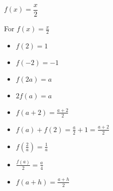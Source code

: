 {$f(x) = \dfrac{x}{2}$}
{For $f(x) = \frac{x}{2}$

\begin{itemize}
\item  $f(2) = 1$
\item  $f(-2) = -1$
\item  $f(2a) = a$
\item  $2 f(a) = a$
\item $f(a+2) = \frac{a+2}{2}$
\item $f(a) + f(2) = \frac{a}{2}+ 1 = \frac{a+2}{2}$
\item  $f \left( \frac{2}{a} \right) = \frac{1}{a}$
\item $\frac{f(a)}{2} =  \frac{a}{4}$
\item  $f(a + h) = \frac{a+h}{2}$
\end{itemize}
}